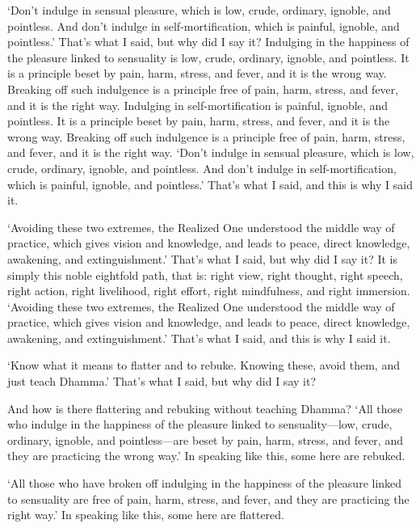 \documentclass[12pt,openany]{book}%
\begin{document}
‘Don’t indulge in sensual pleasure, which is low, crude, ordinary, ignoble, and pointless. And don’t indulge in self-mortification, which is painful, ignoble, and pointless.’ That’s what I said, but why did I say it? Indulging in the happiness of the pleasure linked to sensuality is low, crude, ordinary, ignoble, and pointless. It is a principle beset by pain, harm, stress, and fever, and it is the wrong way. Breaking off such indulgence is a principle free of pain, harm, stress, and fever, and it is the right way. Indulging in self-mortification is painful, ignoble, and pointless. It is a principle beset by pain, harm, stress, and fever, and it is the wrong way. Breaking off such indulgence is a principle free of pain, harm, stress, and fever, and it is the right way. ‘Don’t indulge in sensual pleasure, which is low, crude, ordinary, ignoble, and pointless. And don’t indulge in self-mortification, which is painful, ignoble, and pointless.’ That’s what I said, and this is why I said it. 

‘Avoiding these two extremes, the Realized One understood the middle way of practice, which gives vision and knowledge, and leads to peace, direct knowledge, awakening, and extinguishment.’ That’s what I said, but why did I say it? It is simply this noble eightfold path, that is: right view, right thought, right speech, right action, right livelihood, right effort, right mindfulness, and right immersion. ‘Avoiding these two extremes, the Realized One understood the middle way of practice, which gives vision and knowledge, and leads to peace, direct knowledge, awakening, and extinguishment.’ That’s what I said, and this is why I said it. 

‘Know what it means to flatter and to rebuke. Knowing these, avoid them, and just teach Dhamma.’ That’s what I said, but why did I say it? 

And how is there flattering and rebuking without teaching Dhamma? ‘All those who indulge in the happiness of the pleasure linked to sensuality—low, crude, ordinary, ignoble, and pointless—are beset by pain, harm, stress, and fever, and they are practicing the wrong way.’ In speaking like this, some here are rebuked. 

‘All those who have broken off indulging in the happiness of the pleasure linked to sensuality are free of pain, harm, stress, and fever, and they are practicing the right way.’ In speaking like this, some here are flattered. 
\end{document}
